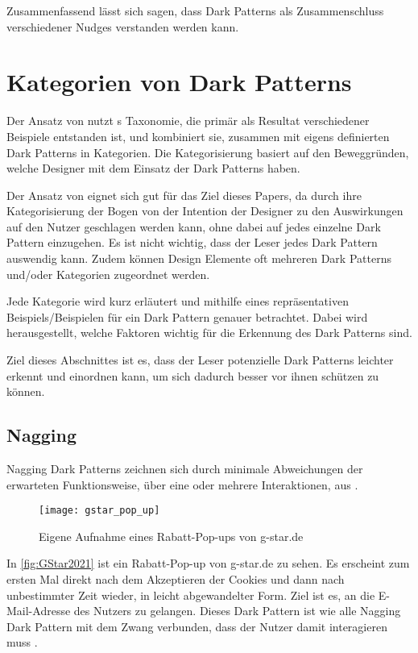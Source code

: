 \documentclass[conference,compsoc,final,a4paper]{IEEEtran}
\begin{document}
Zusammenfassend lässt sich sagen, dass Dark Patterns als Zusammenschluss verschiedener Nudges verstanden werden kann.

\section{Kategorien von Dark Patterns}
Der Ansatz von \citeauthor*{Gray_2018} \autocite{Gray_2018} nutzt \citeauthor{Brignull}s \autocite{Brignull} Taxonomie, die primär als Resultat verschiedener Beispiele entstanden ist, und kombiniert sie, zusammen mit eigens definierten Dark Patterns in Kategorien. Die Kategorisierung basiert auf den Beweggründen, welche Designer mit dem Einsatz der Dark Patterns haben.

Der Ansatz von \citeauthor*{Gray_2018} \autocite{Gray_2018} eignet sich gut für das Ziel dieses Papers, da durch ihre Kategorisierung der Bogen von der Intention der Designer zu den Auswirkungen auf den Nutzer geschlagen werden kann, ohne dabei auf jedes einzelne Dark Pattern einzugehen. Es ist nicht wichtig, dass der Leser jedes Dark Pattern auswendig kann. Zudem können Design Elemente oft mehreren Dark Patterns und/oder Kategorien zugeordnet werden.

Jede Kategorie wird kurz erläutert und mithilfe eines repräsentativen Beispiels/Beispielen für ein Dark Pattern genauer betrachtet. Dabei wird herausgestellt, welche Faktoren wichtig für die Erkennung des Dark Patterns sind.

Ziel dieses Abschnittes ist es, dass der Leser potenzielle Dark Patterns leichter erkennt und einordnen kann, um sich dadurch besser vor ihnen schützen zu können.
\subsection{Nagging}
Nagging Dark Patterns zeichnen sich durch minimale Abweichungen der erwarteten Funktionsweise, über eine oder mehrere Interaktionen, aus \autocite{Gray_2018}.

\begin{figure}[!ht]
  \centering
  \texttt{[image: gstar\_pop\_up]}
  \caption{Eigene Aufnahme eines Rabatt-Pop-ups von g-star.de~\autocite{GStar2021}}
  \label{fig:GStar2021}
\end{figure}

In \autoref{fig:GStar2021} ist ein Rabatt-Pop-up von g-star.de zu sehen. Es erscheint zum ersten Mal direkt nach dem Akzeptieren der Cookies und dann nach unbestimmter Zeit wieder, in leicht abgewandelter Form. Ziel ist es, an die E-Mail-Adresse des Nutzers zu gelangen. Dieses Dark Pattern ist wie alle Nagging Dark Pattern mit dem Zwang verbunden, dass der Nutzer damit interagieren muss \autocite{Gray_2018}.
\end{document}
